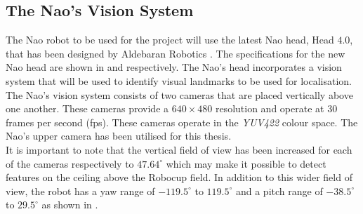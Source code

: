 \subsection{The Nao's Vision System}
\label{sec:naoSpecs}
The Nao robot to be used for the project will use the latest Nao head, Head $4.0$, that has been designed by Aldebaran Robotics \citep{NaoHead}. The specifications for the new Nao head are shown in  and  respectively. The Nao's head incorporates a vision system that will be used to identify visual landmarks to be used for localisation.\\

The Nao's vision system consists of two cameras that are placed vertically above one another. These cameras provide a $640 \times 480$ resolution and operate at $30$ frames per second (fps). These cameras operate in the \textit{YUV422} colour space. The Nao's upper camera has been utilised for this thesis.\\

It is important to note that the vertical field of view has been increased for each of the cameras respectively to $47.64^\circ$ which may make it possible to detect features on the ceiling above the Robocup field. In addition to this wider field of view, the robot has a yaw range of $-119.5^\circ$ to $119.5^\circ$ and a pitch range of $-38.5^\circ$ to $29.5^\circ$ as shown in .\\ 

